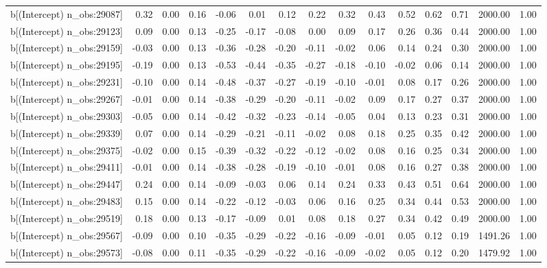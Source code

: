\begin{table}[ht]
\begin{tabular}{rrrrrrrrrrrrrrr}
  b[(Intercept) n\_obs:29087] & 0.32 & 0.00 & 0.16 & -0.06 & 0.01 & 0.12 & 0.22 & 0.32 & 0.43 & 0.52 & 0.62 & 0.71 & 2000.00 & 1.00 \\ 
  b[(Intercept) n\_obs:29123] & 0.09 & 0.00 & 0.13 & -0.25 & -0.17 & -0.08 & 0.00 & 0.09 & 0.17 & 0.26 & 0.36 & 0.44 & 2000.00 & 1.00 \\ 
  b[(Intercept) n\_obs:29159] & -0.03 & 0.00 & 0.13 & -0.36 & -0.28 & -0.20 & -0.11 & -0.02 & 0.06 & 0.14 & 0.24 & 0.30 & 2000.00 & 1.00 \\ 
  b[(Intercept) n\_obs:29195] & -0.19 & 0.00 & 0.13 & -0.53 & -0.44 & -0.35 & -0.27 & -0.18 & -0.10 & -0.02 & 0.06 & 0.14 & 2000.00 & 1.00 \\ 
  b[(Intercept) n\_obs:29231] & -0.10 & 0.00 & 0.14 & -0.48 & -0.37 & -0.27 & -0.19 & -0.10 & -0.01 & 0.08 & 0.17 & 0.26 & 2000.00 & 1.00 \\ 
  b[(Intercept) n\_obs:29267] & -0.01 & 0.00 & 0.14 & -0.38 & -0.29 & -0.20 & -0.11 & -0.02 & 0.09 & 0.17 & 0.27 & 0.37 & 2000.00 & 1.00 \\ 
  b[(Intercept) n\_obs:29303] & -0.05 & 0.00 & 0.14 & -0.42 & -0.32 & -0.23 & -0.14 & -0.05 & 0.04 & 0.13 & 0.23 & 0.31 & 2000.00 & 1.00 \\ 
  b[(Intercept) n\_obs:29339] & 0.07 & 0.00 & 0.14 & -0.29 & -0.21 & -0.11 & -0.02 & 0.08 & 0.18 & 0.25 & 0.35 & 0.42 & 2000.00 & 1.00 \\ 
  b[(Intercept) n\_obs:29375] & -0.02 & 0.00 & 0.15 & -0.39 & -0.32 & -0.22 & -0.12 & -0.02 & 0.08 & 0.16 & 0.25 & 0.34 & 2000.00 & 1.00 \\ 
  b[(Intercept) n\_obs:29411] & -0.01 & 0.00 & 0.14 & -0.38 & -0.28 & -0.19 & -0.10 & -0.01 & 0.08 & 0.16 & 0.27 & 0.38 & 2000.00 & 1.00 \\ 
  b[(Intercept) n\_obs:29447] & 0.24 & 0.00 & 0.14 & -0.09 & -0.03 & 0.06 & 0.14 & 0.24 & 0.33 & 0.43 & 0.51 & 0.64 & 2000.00 & 1.00 \\ 
  b[(Intercept) n\_obs:29483] & 0.15 & 0.00 & 0.14 & -0.22 & -0.12 & -0.03 & 0.06 & 0.16 & 0.25 & 0.34 & 0.44 & 0.53 & 2000.00 & 1.00 \\ 
  b[(Intercept) n\_obs:29519] & 0.18 & 0.00 & 0.13 & -0.17 & -0.09 & 0.01 & 0.08 & 0.18 & 0.27 & 0.34 & 0.42 & 0.49 & 2000.00 & 1.00 \\ 
  b[(Intercept) n\_obs:29567] & -0.09 & 0.00 & 0.10 & -0.35 & -0.29 & -0.22 & -0.16 & -0.09 & -0.01 & 0.05 & 0.12 & 0.19 & 1491.26 & 1.00 \\ 
  b[(Intercept) n\_obs:29573] & -0.08 & 0.00 & 0.11 & -0.35 & -0.29 & -0.22 & -0.16 & -0.09 & -0.02 & 0.05 & 0.12 & 0.20 & 1479.92 & 1.00 \\ 

\end{tabular}
\end{table}
